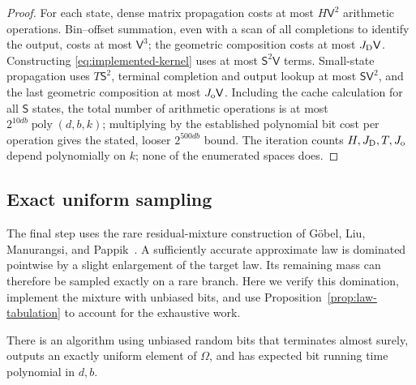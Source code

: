 \begin{proof}
For each state, dense matrix propagation costs at most
$H\mathsf V^2$ arithmetic operations. Bin--offset summation, even with
a scan of all completions to identify the output, costs at most
$\mathsf V^3$; the geometric composition costs at most
$J_{\rm D}\mathsf V$. Constructing \eqref{eq:implemented-kernel} uses at
most $\mathsf S^2\mathsf V$ terms. Small-state propagation uses
$T\mathsf S^2$, terminal completion and output lookup at most
$\mathsf S\mathsf V^2$, and the last geometric composition at most
$J_{\rm o}\mathsf V$. Including the cache calculation for all
$\mathsf S$ states, the total number of arithmetic operations is at most
$2^{10db}\operatorname{poly}(d,b,k)$; multiplying by the established
polynomial bit cost per operation gives the stated, looser $2^{500db}$
bound. The iteration counts $H,J_{\rm D},T,J_{\rm o}$ depend polynomially
on $k$; none of the enumerated spaces does.
\end{proof}

\subsection{Exact uniform sampling}

The final step uses the rare residual-mixture construction of G\"obel,
Liu, Manurangsi, and Pappik~\cite[Section~3.1, Algorithm~1 and
Theorem~6]{GLMP2024}. A sufficiently accurate approximate law is dominated
pointwise by a slight enlargement of the target law. Its remaining mass
can therefore be sampled exactly on a rare branch. Here we verify this
domination, implement the mixture with unbiased bits, and use
Proposition~\ref{prop:law-tabulation} to account for the exhaustive work.

\begin{theorem}\label{thm:exact-sampling}
There is an algorithm using unbiased random bits that terminates almost
surely, outputs an exactly uniform element of $\Omega$, and has expected
bit running time polynomial in $d,b$.
\end{theorem}

